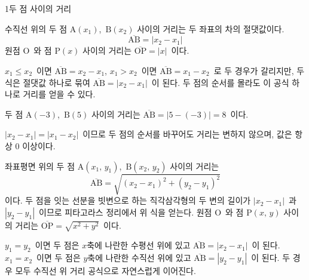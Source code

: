 \documentclass[10pt]{article}
\begin{document}

\begin{dmconcept}{1}{두 점 사이의 거리}
\setlength{\parskip}{1.9mm plus 2.0mm minus 0mm}\linespread{1.27}\selectfont%


수직선 위의 두 점 $\mathrm{A}(x_1)$,\ $\mathrm{B}(x_2)$ 사이의 거리는 두 좌표의 차의 절댓값이다.
\begin{equation*}
  \overline{\mathrm{AB}} = |x_2 - x_1|
\end{equation*}
원점 $\mathrm{O}$\ 와 점 $\mathrm{P}(x)$ 사이의 거리는 $\overline{\mathrm{OP}} = |x|$\ 이다.

\begin{dmexplain}
$x_1 \le x_2$\ 이면 $\overline{\mathrm{AB}} = x_2 - x_1$, $x_1 > x_2$\ 이면 $\overline{\mathrm{AB}} = x_1 - x_2$\ 로 두 경우가 갈리지만, 두 식은 절댓값 하나로 묶여 $\overline{\mathrm{AB}} = |x_2 - x_1|$\ 이 된다. 두 점의 순서를 몰라도 이 공식 하나로 거리를 얻을 수 있다.
\end{dmexplain}

\begin{dmexample}
두 점 $\mathrm{A}(-3)$,\ $\mathrm{B}(5)$ 사이의 거리는 $\overline{\mathrm{AB}} = |5 - (-3)| = 8$\ 이다.
\end{dmexample}

\begin{dmnote}
$|x_2 - x_1| = |x_1 - x_2|$\ 이므로 두 점의 순서를 바꾸어도 거리는 변하지 않으며, 값은 항상 $0$ 이상이다.
\end{dmnote}


좌표평면 위의 두 점 $\mathrm{A}(x_1,\, y_1)$,\ $\mathrm{B}(x_2,\, y_2)$ 사이의 거리는
\begin{equation*}
  \overline{\mathrm{AB}} = \sqrt{(x_2 - x_1)^2 + (y_2 - y_1)^2}
\end{equation*}
이다. 두 점을 잇는 선분을 빗변으로 하는 직각삼각형의 두 변의 길이가 $|x_2 - x_1|$\ 과 $|y_2 - y_1|$\ 이므로 피타고라스 정리에서 위 식을 얻는다. 원점 $\mathrm{O}$\ 와 점 $\mathrm{P}(x,\, y)$ 사이의 거리는 $\overline{\mathrm{OP}} = \sqrt{x^2 + y^2}$\ 이다.

\begin{dmexplain}
$y_1 = y_2$\ 이면 두 점은 $x$축에 나란한 수평선 위에 있고 $\overline{\mathrm{AB}} = |x_2 - x_1|$\ 이 된다. $x_1 = x_2$\ 이면 두 점은 $y$축에 나란한 수직선 위에 있고 $\overline{\mathrm{AB}} = |y_2 - y_1|$\ 이 된다. 두 경우 모두 수직선 위 거리 공식으로 자연스럽게 이어진다.
\end{dmexplain}


\end{dmconcept}
\end{document}
